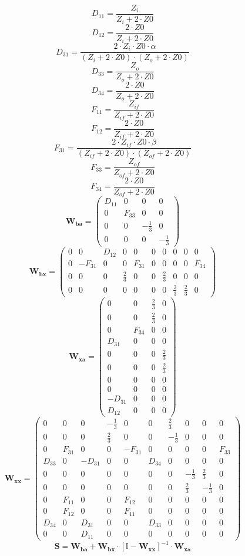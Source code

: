 \[ D_{11}=\frac{Z_i}{Z_i+2\cdot Z0} \]
\[ D_{12}=\frac{2\cdot Z0}{Z_i+2\cdot Z0} \]
\[ D_{31}=\frac{2\cdot Z_i\cdot Z0\cdot \alpha}{\left(Z_i+2\cdot
Z0\right)\cdot\left(Z_o+2\cdot Z0\right)} \]
\[ D_{33}=\frac{Z_o}{Z_o+2\cdot Z0} \]
\[ D_{34}=\frac{2\cdot Z0}{Z_o+2\cdot Z0} \]
\[ F_{11}=\frac{Z_{if}}{Z_{if}+2\cdot Z0} \]
\[ F_{12}=\frac{2\cdot Z0}{Z_{if}+2\cdot Z0} \]
\[ F_{31}=\frac{2\cdot Z_{if}\cdot Z0\cdot \beta}{\left(Z_{if}+2\cdot
Z0\right)\cdot\left(Z_{of}+2\cdot Z0\right)} \]
\[ F_{33}=\frac{Z_{of}}{Z_{of}+2\cdot Z0} \]
\[ F_{34}=\frac{2\cdot Z0}{Z_{of}+2\cdot Z0} \]
\[ \mathbf{W_{ba}} = \left(\begin{smallmatrix} D_{11} & 0 & 0 & 0 \\ 0
& F_{33} & 0 & 0 \\ 0 & 0 & -\frac{1}{3} & 0 \\ 0 & 0 & 0 &
-\frac{1}{3} \end{smallmatrix}\right) \]
\[ \mathbf{W_{bx}} = \left(\begin{smallmatrix} 0 & 0 & D_{12} & 0 & 0
& 0 & 0 & 0 & 0 & 0 \\ 0 & -F_{31} & 0 & 0 & F_{31} & 0 & 0 & 0 & 0 &
F_{34} \\ 0 & 0 & 0 & \frac{2}{3} & 0 & 0 & \frac{2}{3} & 0 & 0 & 0 \\
0 & 0 & 0 & 0 & 0 & 0 & 0 & \frac{2}{3} & \frac{2}{3} & 0
\end{smallmatrix}\right) \]
\[ \mathbf{W_{xa}} = \left(\begin{smallmatrix} 0 & 0 & \frac{2}{3} & 0
\\ 0 & 0 & \frac{2}{3} & 0 \\ 0 & F_{34} & 0 & 0 \\ D_{31} & 0 & 0 & 0
\\ 0 & 0 & 0 & \frac{2}{3} \\ 0 & 0 & 0 & \frac{2}{3} \\ 0 & 0 & 0 & 0
\\ 0 & 0 & 0 & 0 \\ -D_{31} & 0 & 0 & 0 \\ D_{12} & 0 & 0 & 0
\end{smallmatrix}\right) \]
\[ \mathbf{W_{xx}} = \left(\begin{smallmatrix} 0 & 0 & 0 &
-\frac{1}{3} & 0 & 0 & \frac{2}{3} & 0 & 0 & 0 \\ 0 & 0 & 0 &
\frac{2}{3} & 0 & 0 & -\frac{1}{3} & 0 & 0 & 0 \\ 0 & F_{31} & 0 & 0 &
-F_{31} & 0 & 0 & 0 & 0 & F_{33} \\ D_{33} & 0 & -D_{31} & 0 & 0 &
D_{34} & 0 & 0 & 0 & 0 \\ 0 & 0 & 0 & 0 & 0 & 0 & 0 & -\frac{1}{3} &
\frac{2}{3} & 0 \\ 0 & 0 & 0 & 0 & 0 & 0 & 0 & \frac{2}{3} &
-\frac{1}{3} & 0 \\ 0 & F_{11} & 0 & 0 & F_{12} & 0 & 0 & 0 & 0 & 0 \\
0 & F_{12} & 0 & 0 & F_{11} & 0 & 0 & 0 & 0 & 0 \\ D_{34} & 0 & D_{31}
& 0 & 0 & D_{33} & 0 & 0 & 0 & 0 \\ 0 & 0 & D_{11} & 0 & 0 & 0 & 0 & 0
& 0 & 0 \end{smallmatrix}\right) \]
\[ \mathbf{S}=\mathbf{W_{ba}}+\mathbf{W_{bx}}\cdot\left[ \mathbb{I}
-\mathbf{W_{xx}}\right]^{-1}\cdot\mathbf{W_{xa}} \]
